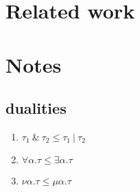 \documentclass[sigplan,screen]{acmart}
\begin{document}
\section{Related work}

\section*{Notes}

\subsection*{dualities}
\begin{enumerate}
  \item \(\tau_1\ \&\ \tau_2  \leq \tau_1\ |\ \tau_2 \)
  \item \(\forall \alpha . \tau \leq \exists \alpha . \tau \)
  \item \(\nu \alpha . \tau \leq \mu \alpha . \tau \)
\end{enumerate}
\end{document}
